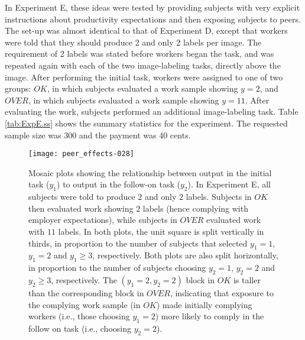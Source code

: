 \documentclass[12pt]{article}
\begin{document}
In Experiment E, these ideas were tested by providing subjects with
very explicit instructions about productivity expectations and then
exposing subjects to peers. The set-up was almost identical to that of
Experiment D, except that workers were told that they should produce 2
and only 2 labels per image. The requirement of 2 labels was stated
before workers began the task, and was repeated again with each of the
two image-labeling tasks, directly above the image. After performing
the initial task, workers were assigned to one of two groups: $OK$, in
which subjects evaluated a work sample showing $y=2$, and $OVER$, in
which subjects evaluated a work sample showing $y=11$. After
evaluating the work, subjects performed an additional image-labeling
task. Table \ref{tab:ExpE.ss} shows the summary statistics for
the experiment. The requested sample size was $300$ and the payment
was 40 cents.




\begin{figure} 
\centering 
\texttt{[image: peer\_effects-028]}
\caption{Mosaic plots showing the relationship between output in the
  initial task ($y_1$) to output in the follow-on task ($y_2$). In
  Experiment E, all subjects were told to produce $2$ and only $2$
  labels. Subjects in $OK$ then evaluated work showing $2$ labels
  (hence complying with employer expectations), while subjects in
  $OVER$ evaluated work with $11$ labels. In both plots, the unit
  square is split vertically in thirds, in proportion to the number of
  subjects that selected $y_1=1$, $y_1=2$ and $y_1 \ge 3$,
  respectively. Both plots are also split horizontally, in proportion
  to the number of subjects choosing $y_2=1$, $y_2=2$ and $y_2 \ge 3$,
  respectively.  The $(y_1 = 2,y_2 = 2)$ block in $OK$ is taller than
  the corresponding block in $OVER$, indicating that exposure to the
  complying work sample (in $OK$) made initially complying workers
  (i.e., those choosing $y_1=2$) more likely to comply in the follow
  on task (i.e., choosing $y_2=2$).
  \label{fig:ExpE.trans}}
\end{figure} 
\end{document}
